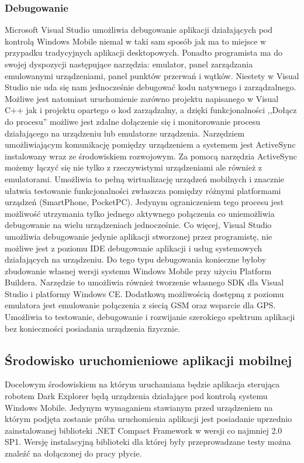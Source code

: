 \subsubsection{Debugowanie}
Microsoft Visual Studio umożliwia debugowanie aplikacji działających pod kontrolą
Windows Mobile niemal w taki sam sposób jak ma to miejsce w przypadku
tradycyjnych aplikacji desktopowych. Ponadto programista ma do swojej dyspozycji
następujące narzędzia: emulator, panel zarządzania emulowanymi urządzeniami,
panel punktów przerwań i wątków. Niestety w Visual Studio nie uda się nam
jednocześnie debugować kodu natywnego i zarządzalnego. Możliwe jest natomiast
uruchomienie zarówno projektu napisanego w Visual C++ jak i projektu opartego o
kod zarządzalny, a dzięki funkcjonalności ,,Dołącz do procesu'' możliwe jest
zdalne dołączenie się i monitorowanie procesu działającego na urządzeniu lub
emulatorze urządzenia. Narzędziem umożliwiającym komunikację pomiędzy urządzeniem
a systemem jest ActiveSync instalowany wraz ze środowiskiem rozwojowym. Za pomocą
narzędzia ActiveSync możemy łączyć się nie tylko z rzeczywistymi urządzeniami ale
również z emulatorami. Umożliwia to pełną wirtualizację urządzeń mobilnych i
znacznie ułatwia testowanie funkcjonalności zwłaszcza pomiędzy różnymi
platformami urządzeń (SmartPhone, PocketPC). Jedynym ograniczeniem tego procesu
jest możliwość utrzymania tylko jednego aktywnego połączenia co uniemożliwia
debugowanie na wielu urządzeniach jednocześnie. Co więcej, Visual Studio umożliwia
debugowanie jedynie aplikacji stworzonej przez programistę, nie możliwe jest z
poziomu IDE debugowanie aplikacji i usług systemowych działających na urządzeniu.
Do tego typu debugowania konieczne byłoby zbudowanie własnej wersji systemu
Windows Mobile przy użyciu Platform Buildera. Narzędzie to umożliwia również
tworzenie własnego SDK dla Visual Studio i platformy Windows CE. Dodatkową
możliwością dostępną z poziomu emulatora jest emulowanie połączenia z siecią GSM
oraz wsparcie dla GPS. Umożliwia to testowanie, debugowanie i rozwijanie
szerokiego spektrum aplikacji bez konieczności posiadania urządzenia fizycznie.

\subsection{Środowisko uruchomieniowe aplikacji mobilnej}
Docelowym środowiskiem na którym uruchamiana będzie aplikacja sterująca robotem
Dark Explorer będą urządzenia działające pod kontrolą systemu Windows Mobile.
Jedynym wymaganiem stawianym przed urządzeniem na którym podjęta zostanie próba
uruchomienia aplikacji jest posiadanie uprzednio zainstalowanej biblioteki .NET
Compact Framework w wersji co najmniej 2.0 SP1. Wersję instalacyjną biblioteki
dla której były przeprowadzane testy można znaleźć na dołączonej do pracy
płycie. 


